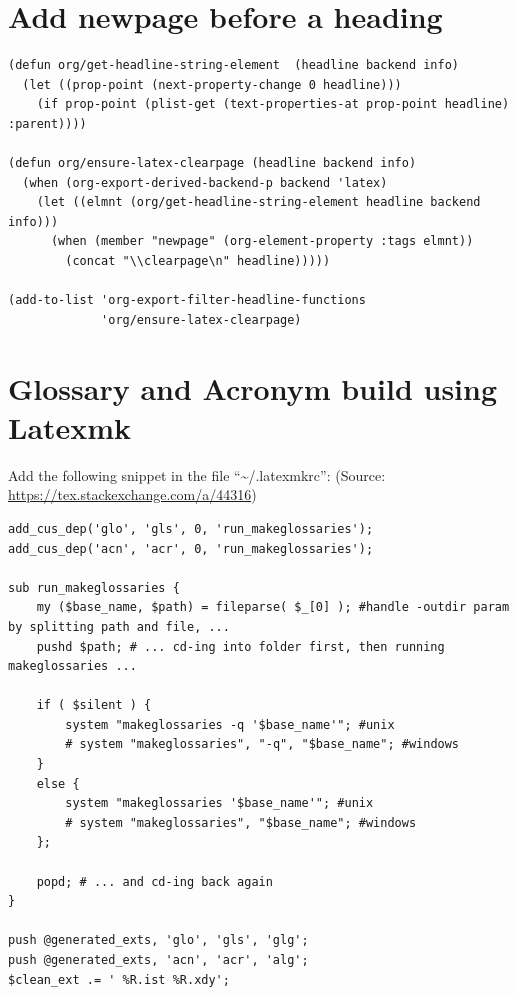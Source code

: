 \documentclass[letterpaper, 12pt]{report}
\begin{document}
\section{Add newpage before a heading}
\label{sec:org01683d7}

\begin{verbatim}
(defun org/get-headline-string-element  (headline backend info)
  (let ((prop-point (next-property-change 0 headline)))
    (if prop-point (plist-get (text-properties-at prop-point headline) :parent))))

(defun org/ensure-latex-clearpage (headline backend info)
  (when (org-export-derived-backend-p backend 'latex)
    (let ((elmnt (org/get-headline-string-element headline backend info)))
      (when (member "newpage" (org-element-property :tags elmnt))
        (concat "\\clearpage\n" headline)))))

(add-to-list 'org-export-filter-headline-functions
             'org/ensure-latex-clearpage)

\end{verbatim}

\section{Glossary and Acronym build using Latexmk}
\label{sec:orga3bc779}

Add the following snippet in the file ``\textasciitilde{}/.latexmkrc'': (Source: \url{https://tex.stackexchange.com/a/44316})

\begin{verbatim}
add_cus_dep('glo', 'gls', 0, 'run_makeglossaries');
add_cus_dep('acn', 'acr', 0, 'run_makeglossaries');

sub run_makeglossaries {
    my ($base_name, $path) = fileparse( $_[0] ); #handle -outdir param by splitting path and file, ...
    pushd $path; # ... cd-ing into folder first, then running makeglossaries ...

    if ( $silent ) {
        system "makeglossaries -q '$base_name'"; #unix
        # system "makeglossaries", "-q", "$base_name"; #windows
    }
    else {
        system "makeglossaries '$base_name'"; #unix
        # system "makeglossaries", "$base_name"; #windows
    };

    popd; # ... and cd-ing back again
}

push @generated_exts, 'glo', 'gls', 'glg';
push @generated_exts, 'acn', 'acr', 'alg';
$clean_ext .= ' %R.ist %R.xdy';
\end{verbatim}
\end{document}
